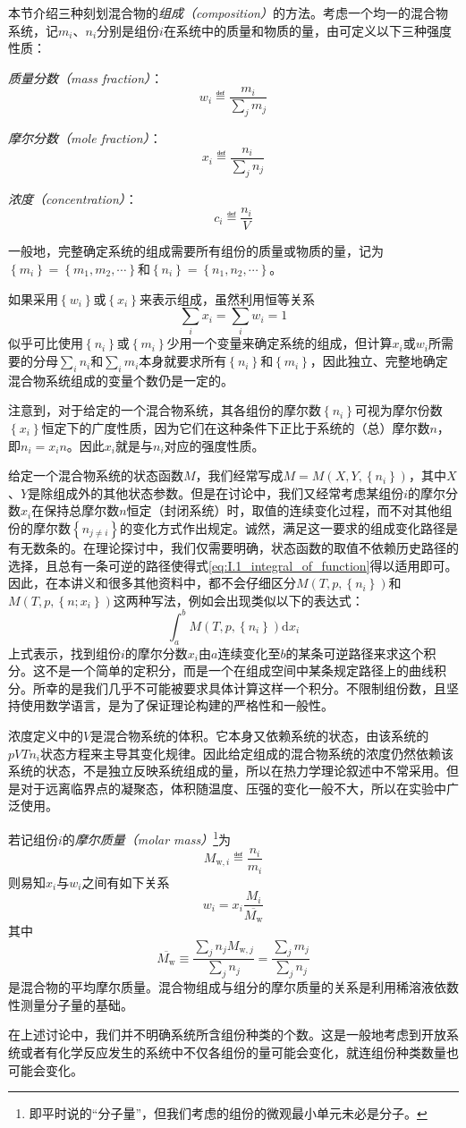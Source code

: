 \documentclass[main.tex]{subfiles}
\begin{document}
本节介绍三种刻划混合物的\emph{组成（composition）}的方法。考虑一个均一的混合物系统，记$m_i$、$n_i$分别是组份$i$在系统中的质量和物质的量，由可定义以下三种强度性质：

\emph{质量分数（mass fraction）}：
\[w_i\eqdef\frac{m_i}{\sum_jm_j}\]

\emph{摩尔分数（mole fraction）}：
\[x_i\eqdef\frac{n_i}{\sum_jn_j}\]

\emph{浓度（concentration）}：
\[c_i\eqdef\frac{n_i}{V}\]

一般地，完整确定系统的组成需要所有组份的质量或物质的量，记为$\left\{m_i\right\}=\left\{m_1,m_2,\cdots\right\}$和$\left\{n_i\right\}=\left\{n_1,n_2,\cdots\right\}$。

如果采用$\left\{w_i\right\}$或$\left\{x_i\right\}$来表示组成，虽然利用恒等关系
\[\sum_ix_i=\sum_iw_i=1\]
似乎可比使用$\left\{n_i\right\}$或$\left\{m_i\right\}$少用一个变量来确定系统的组成，但计算$x_i$或$w_i$所需要的分母$\sum_in_i$和$\sum_im_i$本身就要求所有$\left\{n_i\right\}$和$\left\{m_i\right\}$，因此独立、完整地确定混合物系统组成的变量个数仍是一定的。

注意到，对于给定的一个混合物系统，其各组份的摩尔数$\left\{n_i\right\}$可视为摩尔份数$\left\{x_i\right\}$恒定下的广度性质，因为它们在这种条件下正比于系统的（总）摩尔数$n$，即$n_i=x_in$。因此$x_i$就是与$n_i$对应的强度性质。

给定一个混合物系统的状态函数$M$，我们经常写成$M=M\left(X,Y,\left\{n_i\right\}\right)$，其中$X$、$Y$是除组成外的其他状态参数。但是在讨论中，我们又经常考虑某组份$i$的摩尔分数$x_i$在保持总摩尔数$n$恒定（封闭系统）时，取值的连续变化过程，而不对其他组份的摩尔数$\left\{n_{j\neq i}\right\}$的变化方式作出规定。诚然，满足这一要求的组成变化路径是有无数条的。在理论探讨中，我们仅需要明确，状态函数的取值不依赖历史路径的选择，且总有一条可逆的路径使得式\eqref{eq:I.1_integral_of_function}得以适用即可。因此，在本讲义和很多其他资料中，都不会仔细区分$M\left(T,p,\left\{n_i\right\}\right)$和$M\left(T,p,\left\{n;x_i\right\}\right)$这两种写法，例如会出现类似以下的表达式：
\[\int_a^bM\left(T,p,\left\{n_i\right\}\right)\mathrm{d}x_i\]
上式表示，找到组份$i$的摩尔分数$x_i$由$a$连续变化至$b$的某条可逆路径来求这个积分。这不是一个简单的定积分，而是一个在组成空间中某条规定路径上的曲线积分。所幸的是我们几乎不可能被要求具体计算这样一个积分。不限制组份数，且坚持使用数学语言，是为了保证理论构建的严格性和一般性。

浓度定义中的$V$是混合物系统的体积。它本身又依赖系统的状态，由该系统的$pVTn_i$状态方程来主导其变化规律。因此给定组成的混合物系统的浓度仍然依赖该系统的状态，不是独立反映系统组成的量，所以在热力学理论叙述中不常采用。但是对于远离临界点的凝聚态，体积随温度、压强的变化一般不大，所以在实验中广泛使用。

若记组份$i$的\emph{摩尔质量（molar mass）}\footnote{即平时说的“分子量”，但我们考虑的组份的微观最小单元未必是分子。}为
\[M_{\text{w},i}\eqdef\frac{n_i}{m_i}\]
则易知$x_i$与$w_i$之间有如下关系
\[w_i=x_i\frac{M_i}{\overline{M_\text{w}}}\]
其中
\[\overline{M_\text{w}}\equiv\frac{\sum_jn_jM_{\text{w},j}}{\sum_jn_j}=\frac{\sum_jm_j}{\sum_jn_j}\]
是混合物的平均摩尔质量。混合物组成与组分的摩尔质量的关系是利用稀溶液依数性测量分子量的基础。

在上述讨论中，我们并不明确系统所含组份种类的个数。这是一般地考虑到开放系统或者有化学反应发生的系统中不仅各组份的量可能会变化，就连组份种类数量也可能会变化。
\end{document}
